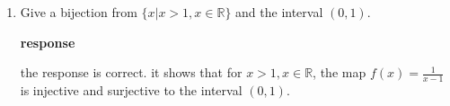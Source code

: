 \documentclass{article}
\begin{document}
\begin{enumerate}
    \item Give a bijection from $\{x | x > 1, x \in \mathbb R\}$ and the interval $(0,1)$.
    
    \textbf{response}



    
    
    
    
        
    
    





    the response is correct. it shows that for \(x>1, x\in \mathbb R\), the map \(f(x)=\frac{1}{x-1}\) is injective and surjective to the interval \((0,1)\). 




\end{enumerate}
\end{document}
